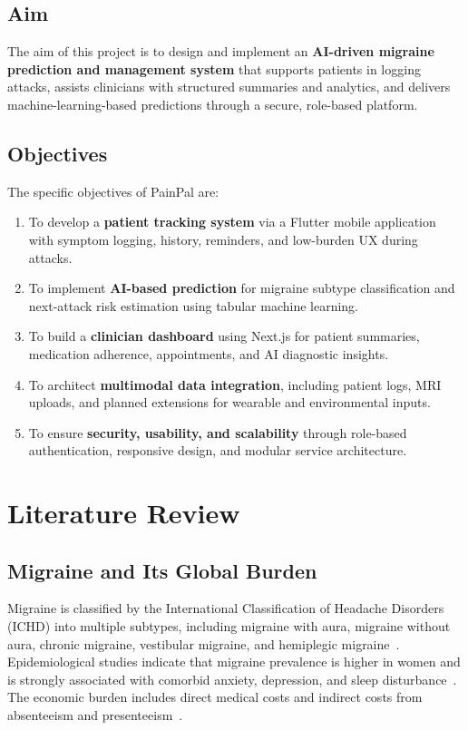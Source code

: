 \documentclass[conference,twocolumn,letterpaper]{IEEEtran}
\begin{document}
\subsection{Aim}
The aim of this project is to design and implement an \textbf{AI-driven migraine prediction and management system} that supports patients in logging attacks, assists clinicians with structured summaries and analytics, and delivers machine-learning-based predictions through a secure, role-based platform.

\subsection{Objectives}
The specific objectives of PainPal are:
\begin{enumerate}
    \item To develop a \textbf{patient tracking system} via a Flutter mobile application with symptom logging, history, reminders, and low-burden UX during attacks.
    \item To implement \textbf{AI-based prediction} for migraine subtype classification and next-attack risk estimation using tabular machine learning.
    \item To build a \textbf{clinician dashboard} using Next.js for patient summaries, medication adherence, appointments, and AI diagnostic insights.
    \item To architect \textbf{multimodal data integration}, including patient logs, MRI uploads, and planned extensions for wearable and environmental inputs.
    \item To ensure \textbf{security, usability, and scalability} through role-based authentication, responsive design, and modular service architecture.
\end{enumerate}

\section{Literature Review}

\subsection{Migraine and Its Global Burden}
Migraine is classified by the International Classification of Headache Disorders (ICHD) into multiple subtypes, including migraine with aura, migraine without aura, chronic migraine, vestibular migraine, and hemiplegic migraine~\cite{ichd3}. Epidemiological studies indicate that migraine prevalence is higher in women and is strongly associated with comorbid anxiety, depression, and sleep disturbance~\cite{lipton2007}. The economic burden includes direct medical costs and indirect costs from absenteeism and presenteeism~\cite{stewart2003}.
\end{document}
